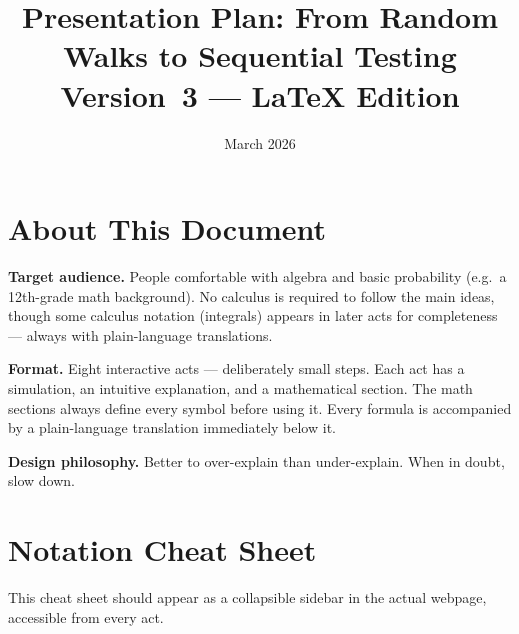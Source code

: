 \documentclass[12pt, a4paper]{article}
\title{\textbf{Presentation Plan: From Random Walks to Sequential Testing}\\[6pt]
       \large Version~3 — \LaTeX{} Edition}
\author{}
\date{March 2026}
\begin{document}
\maketitle
\tableofcontents
\newpage

\section*{About This Document}

\textbf{Target audience.}
People comfortable with algebra and basic probability (e.g.\ a 12th-grade
math background).  No calculus is required to follow the main ideas, though
some calculus notation (integrals) appears in later acts for completeness ---
always with plain-language translations.

\textbf{Format.}
Eight interactive acts --- deliberately small steps.  Each act has a
simulation, an intuitive explanation, and a mathematical section.  The math
sections always define every symbol before using it.  Every formula is
accompanied by a plain-language translation immediately below it.

\textbf{Design philosophy.}
Better to over-explain than under-explain.  When in doubt, slow down.

\section{Notation Cheat Sheet}
\label{sec:notation}

This cheat sheet should appear as a collapsible sidebar in the actual
webpage, accessible from every act.
\end{document}
